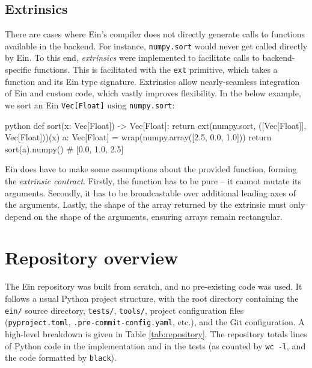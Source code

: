 \subsection{Extrinsics}

There are cases where Ein's compiler does not directly generate calls to functions available in the backend. For instance, \texttt{numpy.sort} would never get called directly by Ein. To this end, \textit{extrinsics} were implemented to facilitate calls to backend-specific functions. This is facilitated with the \texttt{ext} primitive, which takes a function and its Ein type signature. Extrinsics allow nearly-seamless integration of Ein and custom code, which vastly improves flexibility. In the below example, we sort an Ein \texttt{Vec[Float]} using \texttt{numpy.sort}:
\begin{center}
\begin{cminted}{python}    
def sort(x: Vec[Float]) -> Vec[Float]:
    return ext(numpy.sort, ([Vec[Float]], Vec[Float]))(x)
a: Vec[Float] = wrap(numpy.array([2.5, 0.0, 1.0]))
return sort(a).numpy()  # [0.0, 1.0, 2.5]
\end{cminted}
\end{center}

Ein does have to make some assumptions about the provided function, forming the \textit{extrinsic contract}. Firstly, the function has to be pure -- it cannot mutate its arguments. Secondly, it has to be broadcastable over additional leading axes of the arguments. Lastly, the shape of the array returned by the extrinsic must only depend on the shape of the arguments, ensuring arrays remain rectangular. 

\section{Repository overview}
\label{repository-overview}

The Ein repository was built from scratch, and no pre-existing code was used.
It follows a usual Python project structure, with the root directory containing the \texttt{ein/} source directory, \texttt{tests/}, \texttt{tools/}, project configuration files (\texttt{pyproject.toml}, \texttt{.pre-commit-config.yaml}, etc.), and the Git configuration. 
A high-level breakdown is given in Table \ref{tab:repository}. The repository totals \todohere{} lines of Python code in the implementation and \todohere{} in the tests (as counted by \texttt{wc -l}, and the code formatted by \texttt{black}).

